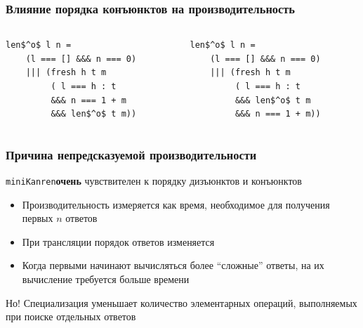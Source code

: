 \documentclass{beamer}
\newcommand{\miniKanren}{\texttt{miniKanren}\xspace}
\begin{document}
\begin{frame}[fragile]
  \frametitle{Влияние порядка конъюнктов на производительность}
\begin{columns}
  \begin{column}[]{0.5\textwidth}
    \begin{center}
      \begin{minipage}{4cm}
      \begin{lstlisting}[frame=single,backgroundcolor = \color{HappyGreen}]
  len$^o$ l n =
    (l === [] &&& n === 0)
    ||| (fresh h t m
         ( l === h : t
         &&& n === 1 + m
         &&& len$^o$ t m))
      \end{lstlisting}
      \end{minipage}
  \end{center}

  \end{column}
  \begin{column}[]{0.5\textwidth}
    \begin{center}
      \begin{minipage}{4cm}
      \begin{lstlisting}[frame=single,backgroundcolor = \color{SadRed}]
  len$^o$ l n =
    (l === [] &&& n === 0)
    ||| (fresh h t m
         ( l === h : t
         &&& len$^o$ t m
         &&& n === 1 + m))
      \end{lstlisting}
      \end{minipage}
  \end{center}

  \end{column}
\end{columns}
\end{frame}

\begin{frame}[fragile]
  \frametitle{Причина непредсказуемой производительности}
  \begin{center}
    \miniKanren \textbf{очень} чувствителен к порядку дизъюнктов и конъюнктов
  \end{center}

  \vfill

  \begin{itemize}
    \item Производительность измеряется как время, необходимое для получения первых $n$ ответов
    \item При трансляции порядок ответов изменяется
    \item Когда первыми начинают вычисляться более ``сложные'' ответы, на их вычисление требуется больше времени
  \end{itemize}

  \vfill

  \begin{center}
    Но! Специализация уменьшает количество элементарных операций, выполняемых при поиске отдельных ответов
  \end{center}
\end{frame}
\end{document}
